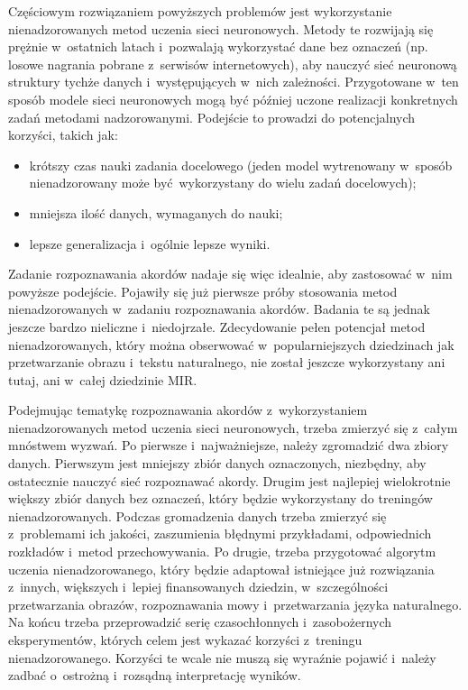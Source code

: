 Częściowym rozwiązaniem powyższych problemów jest wykorzystanie nienadzorowanych metod uczenia sieci neuronowych. Metody te rozwijają się prężnie w~ostatnich latach i~pozwalają wykorzystać dane bez oznaczeń (np. losowe nagrania pobrane z~serwisów internetowych), aby nauczyć sieć neuronową struktury tychże danych i~występujących w~nich zależności. Przygotowane w~ten sposób modele sieci neuronowych mogą być później uczone realizacji konkretnych zadań metodami nadzorowanymi. Podejście to prowadzi do potencjalnych korzyści, takich jak:
\begin{itemize}
    \item krótszy czas nauki zadania docelowego (jeden model wytrenowany w~sposób nienadzorowany może być wykorzystany do wielu zadań docelowych);
    \item mniejsza ilość danych, wymaganych do nauki;
    \item lepsze generalizacja i~ogólnie lepsze wyniki.
\end{itemize}
Zadanie rozpoznawania akordów nadaje się więc idealnie, aby zastosować w~nim powyższe podejście. Pojawiły się już pierwsze próby stosowania metod nienadzorowanych w~zadaniu rozpoznawania akordów. Badania te są jednak jeszcze bardzo nieliczne i~niedojrzałe. Zdecydowanie pełen potencjał metod nienadzorowanych, który można obserwować w~popularniejszych dziedzinach jak przetwarzanie obrazu i~tekstu naturalnego, nie został jeszcze wykorzystany ani tutaj, ani w~całej dziedzinie MIR.

Podejmując tematykę rozpoznawania akordów z~wykorzystaniem nienadzorowanych metod uczenia sieci neuronowych, trzeba zmierzyć się z~całym mnóstwem wyzwań. Po pierwsze i~najważniejsze, należy zgromadzić dwa zbiory danych. Pierwszym jest mniejszy zbiór danych oznaczonych, niezbędny, aby ostatecznie nauczyć sieć rozpoznawać akordy. Drugim jest najlepiej wielokrotnie większy zbiór danych bez oznaczeń, który będzie wykorzystany do treningów nienadzorowanych. Podczas gromadzenia danych trzeba zmierzyć się z~problemami ich jakości, zaszumienia błędnymi przykładami, odpowiednich rozkładów i~metod przechowywania. Po drugie, trzeba przygotować algorytm uczenia nienadzorowanego, który będzie adaptował istniejące już rozwiązania z~innych, większych i~lepiej finansowanych dziedzin, w~szczególności przetwarzania obrazów, rozpoznawania mowy i~przetwarzania języka naturalnego. Na końcu trzeba przeprowadzić serię czasochłonnych i~zasobożernych eksperymentów, których celem jest wykazać korzyści z~treningu nienadzorowanego. Korzyści te wcale nie muszą się wyraźnie pojawić i~należy zadbać o~ostrożną i~rozsądną interpretację wyników.

